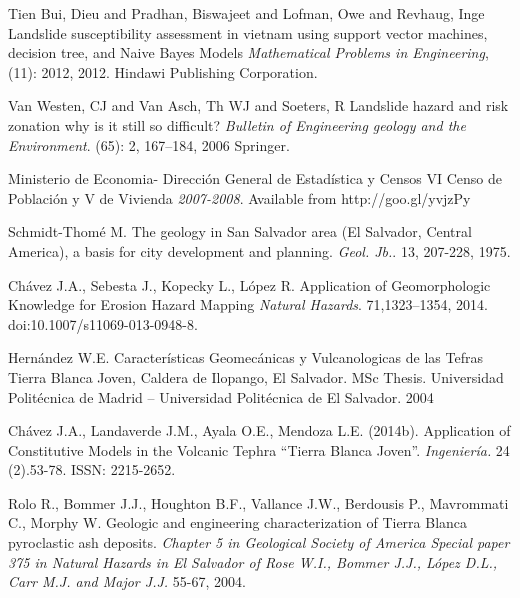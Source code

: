 \documentclass[11pt,twoside]{rmta2010eng}%
\begin{document}
\begin{thebibliography}{99}
Tien Bui, Dieu and Pradhan, Biswajeet and Lofman, Owe and Revhaug, Inge
\newblock Landslide susceptibility assessment in vietnam using support vector machines, decision tree, and Naive Bayes Models
\newblock \emph{Mathematical Problems in Engineering},
  (11): 2012, 2012.
\newblock Hindawi Publishing Corporation.




Van Westen, CJ and Van Asch, Th WJ and Soeters, R
\newblock Landslide hazard and risk zonation why is it still so difficult?
\newblock \emph{Bulletin of Engineering geology and the Environment}.
(65): 2, 167--184, 2006
\newblock Springer. 



Ministerio de Economia- Direcci\'{o}n General de Estad\'{i}stica y Censos
\newblock VI Censo de Poblaci\'{o}n y V de Vivienda
\newblock \emph{2007-2008}.
 Available from http://goo.gl/yvjzPy




Schmidt-Thom\'{e} M.
\newblock The geology in San Salvador area (El Salvador, Central America), a basis for city development and planning.
\newblock \emph{Geol. Jb.}.
 13, 207-228, 1975.


Ch\'{a}vez J.A., Sebesta J., Kopecky L., L\'{o}pez R.
\newblock Application of Geomorphologic Knowledge for Erosion Hazard Mapping
\newblock \emph{Natural Hazards}.
 71,1323–1354, 2014.
\newblock doi:10.1007/s11069-013-0948-8.


Hern\'{a}ndez W.E.
\newblock Caracter\'{i}sticas Geomec\'{a}nicas y Vulcanologicas de las Tefras Tierra Blanca Joven, Caldera de Ilopango, El Salvador.
\newblock MSc Thesis. Universidad Polit\'{e}cnica de Madrid – Universidad Polit\'{e}cnica de El Salvador.
 2004


Ch\'{a}vez J.A.,  Landaverde J.M., Ayala O.E., Mendoza L.E. (2014b). 
\newblock Application of Constitutive Models in the Volcanic Tephra ``Tierra Blanca Joven''.
\newblock \emph{Ingenier\'{i}a.}
  24 (2).53-78.
\newblock  ISSN: 2215-2652.


Rolo R., Bommer J.J., Houghton B.F., Vallance J.W., Berdousis P., Mavrommati C., Morphy W.
\newblock Geologic and engineering characterization of Tierra Blanca pyroclastic ash deposits.
\newblock \emph{Chapter 5 in Geological Society of America Special paper 375 in Natural Hazards in El Salvador of Rose W.I., Bommer J.J., L\'{o}pez D.L., Carr M.J. and Major J.J.}
  55-67, 2004.



\end{thebibliography}
\end{document}
